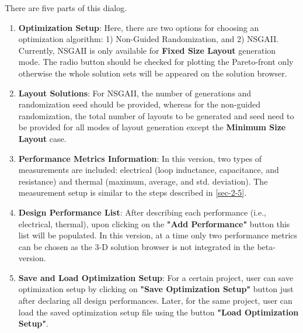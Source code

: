 \documentclass[11pt]{article}
\begin{document}
There are five parts of this dialog.
\begin{enumerate}
    \item \textbf{Optimization Setup}: Here, there are two options for choosing an optimization algorithm: 1) Non-Guided Randomization, and 2) NSGAII. Currently, NSGAII is only available for \textbf{Fixed Size Layout} generation mode. The radio button should be checked for plotting the Pareto-front only otherwise the whole solution sets will be appeared on the solution browser.
    
    \item \textbf{Layout Solutions}: For NSGAII, the number of generations and randomization seed should be provided, whereas for the non-guided randomization, the total number of layouts to be generated and seed need to be provided for all modes of layout generation except the \textbf{Minimum Size Layout} case.
    
    \item \textbf{Performance Metrics Information}: In this version, two types of measurements are included: electrical (loop inductance, capacitance, and resistance) and thermal (maximum, average, and std. deviation). The measurement setup is similar to the steps described in \ref{sec-2-5}.
    
    \item \textbf{Design Performance List}: After describing each performance (i.e., electrical, thermal), upon clicking on the \textbf{"Add Performance"} button this list will be populated. In this version, at a time only two performance metrics can be chosen as the 3-D solution browser is not integrated in the beta-version.
    
    \item \textbf{Save and Load Optimization Setup}: For a certain project, user can save optimization setup by clicking on \textbf{"Save Optimization Setup"} button just after declaring all design performances. Later, for the same project, user can load the saved optimization setup file using the button \textbf{"Load Optimization Setup"}.
\end{enumerate}
\end{document}
